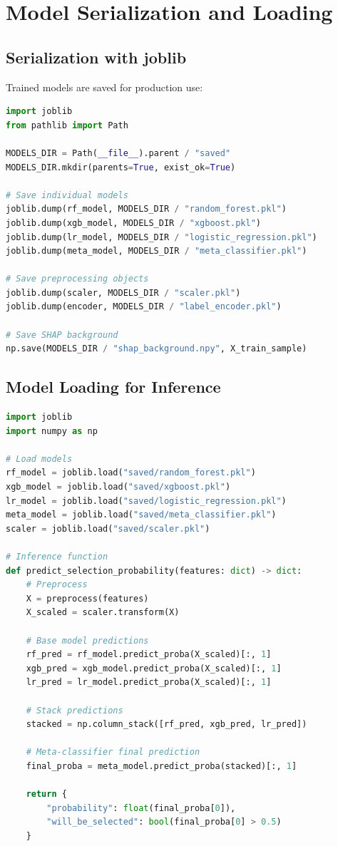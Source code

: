 \documentclass[12pt,a4paper]{report}
\begin{document}
\chapter{Model Serialization and Loading}

\section{Serialization with joblib}

Trained models are saved for production use:

\begin{lstlisting}[language=Python, caption={Model Serialization}]
import joblib
from pathlib import Path

MODELS_DIR = Path(__file__).parent / "saved"
MODELS_DIR.mkdir(parents=True, exist_ok=True)

# Save individual models
joblib.dump(rf_model, MODELS_DIR / "random_forest.pkl")
joblib.dump(xgb_model, MODELS_DIR / "xgboost.pkl")
joblib.dump(lr_model, MODELS_DIR / "logistic_regression.pkl")
joblib.dump(meta_model, MODELS_DIR / "meta_classifier.pkl")

# Save preprocessing objects
joblib.dump(scaler, MODELS_DIR / "scaler.pkl")
joblib.dump(encoder, MODELS_DIR / "label_encoder.pkl")

# Save SHAP background
np.save(MODELS_DIR / "shap_background.npy", X_train_sample)
\end{lstlisting}

\section{Model Loading for Inference}

\begin{lstlisting}[language=Python, caption={Model Loading}]
import joblib
import numpy as np

# Load models
rf_model = joblib.load("saved/random_forest.pkl")
xgb_model = joblib.load("saved/xgboost.pkl")
lr_model = joblib.load("saved/logistic_regression.pkl")
meta_model = joblib.load("saved/meta_classifier.pkl")
scaler = joblib.load("saved/scaler.pkl")

# Inference function
def predict_selection_probability(features: dict) -> dict:
    # Preprocess
    X = preprocess(features)
    X_scaled = scaler.transform(X)
    
    # Base model predictions
    rf_pred = rf_model.predict_proba(X_scaled)[:, 1]
    xgb_pred = xgb_model.predict_proba(X_scaled)[:, 1]
    lr_pred = lr_model.predict_proba(X_scaled)[:, 1]
    
    # Stack predictions
    stacked = np.column_stack([rf_pred, xgb_pred, lr_pred])
    
    # Meta-classifier final prediction
    final_proba = meta_model.predict_proba(stacked)[:, 1]
    
    return {
        "probability": float(final_proba[0]),
        "will_be_selected": bool(final_proba[0] > 0.5)
    }
\end{lstlisting}
\end{document}
